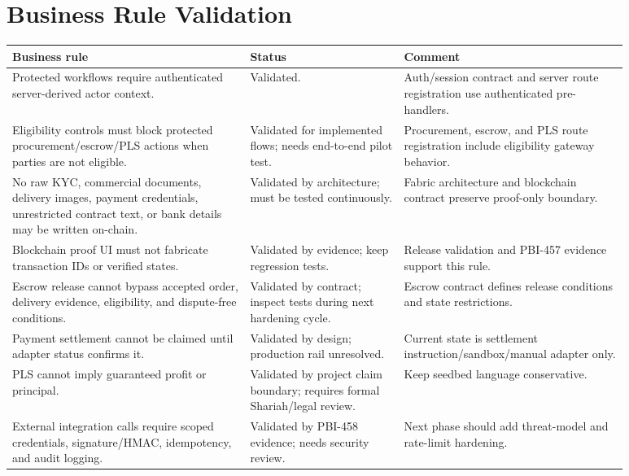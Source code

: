 \documentclass[11pt,a4paper]{article}
\begin{document}
\section{Business Rule Validation}

\begin{longtable}{P{0.34\linewidth}P{0.22\linewidth}P{0.32\linewidth}}
\toprule
Business rule & Status & Comment \\
\midrule
Protected workflows require authenticated server-derived actor context. & Validated. & Auth/session contract and server route registration use authenticated pre-handlers. \\
Eligibility controls must block protected procurement/escrow/PLS actions when parties are not eligible. & Validated for implemented flows; needs end-to-end pilot test. & Procurement, escrow, and PLS route registration include eligibility gateway behavior. \\
No raw KYC, commercial documents, delivery images, payment credentials, unrestricted contract text, or bank details may be written on-chain. & Validated by architecture; must be tested continuously. & Fabric architecture and blockchain contract preserve proof-only boundary. \\
Blockchain proof UI must not fabricate transaction IDs or verified states. & Validated by evidence; keep regression tests. & Release validation and PBI-457 evidence support this rule. \\
Escrow release cannot bypass accepted order, delivery evidence, eligibility, and dispute-free conditions. & Validated by contract; inspect tests during next hardening cycle. & Escrow contract defines release conditions and state restrictions. \\
Payment settlement cannot be claimed until adapter status confirms it. & Validated by design; production rail unresolved. & Current state is settlement instruction/sandbox/manual adapter only. \\
PLS cannot imply guaranteed profit or principal. & Validated by project claim boundary; requires formal Shariah/legal review. & Keep seedbed language conservative. \\
External integration calls require scoped credentials, signature/HMAC, idempotency, and audit logging. & Validated by PBI-458 evidence; needs security review. & Next phase should add threat-model and rate-limit hardening. \\
\bottomrule
\end{longtable}
\end{document}
